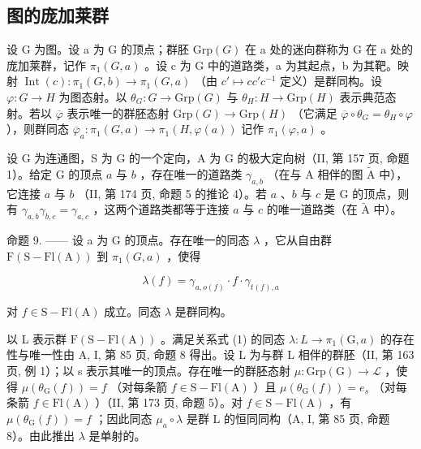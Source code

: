 \subsection{图的庞加莱群}

设 G 为图。设 a 为 G 的顶点；群胚 \(\mathrm{Grp}(G)\) 在 a 处的迷向群称为 G 在 a 处的庞加莱群，记作 \(\pi_{1}(G,a)\) 。设 c 为 G 中的道路类，a 为其起点，b 为其靶。映射 \(\operatorname{Int}(c): \pi_{1}(G,b)\to\pi_{1}(G,a)\) （由 \(c'\mapsto cc'c^{-1}\) 定义）是群同构。设 \(\varphi:G\to H\) 为图态射。以 \(\theta_{G}:G\to\mathrm{Grp}(G)\) 与 \(\theta_{H}:H\to\mathrm{Grp}(H)\) 表示典范态射。若以 \(\overline{\varphi}\) 表示唯一的群胚态射 \(\mathrm{Grp}(G) \to \mathrm{Grp}(H)\) （它满足 \(\overline{\varphi}\circ\theta_{G}=\theta_{H}\circ\varphi\) ），则群同态 \(\overline{\varphi}_{a}:\pi_{1}(G,a)\to\pi_{1}(H,\varphi(a))\) 记作 \(\pi_{1}(\varphi,a)\) 。

设 G 为连通图，S 为 G 的一个定向，A 为 G 的极大定向树（II, 第 157 页, 命题 1）。给定 G 的顶点 \(a\) 与 \(b\) ，存在唯一的道路类 \(\gamma_{a,b}\) （在与 A 相伴的图 \(\widetilde{\mathrm{A}}\) 中），它连接 \(a\) 与 \(b\) （II, 第 174 页, 命题 5 的推论 4）。若 \(a\) 、\(b\) 与 \(c\) 是 G 的顶点，则有 \(\gamma_{a,b}\gamma_{b,c} = \gamma_{a,c}\) ，这两个道路类都等于连接 \(a\) 与 \(c\) 的唯一道路类（在 \(\widetilde{\mathrm{A}}\) 中）。

命题 9. —— 设 a 为 G 的顶点。存在唯一的同态 \(\lambda\) ，它从自由群 \(\mathrm{F}(\mathrm{S}-\mathrm{Fl}(\mathrm{A}))\) 到 \(\pi_1(G, a)\) ，使得

\[
\lambda (f) = \gamma_ {a, o (f)} \cdot f \cdot \gamma_ {t (f), a}\tag{1}
\]

对 \(f \in \mathrm{S} - \mathrm{Fl}(\mathrm{A})\) 成立。同态 \(\lambda\) 是群同构。

以 L 表示群 \(\mathrm{F}(\mathrm{S}-\mathrm{Fl}(\mathrm{A}))\) 。满足关系式 (1) 的同态 \(\lambda\colon L\to\pi_{1}(\mathrm{G},a)\) 的存在性与唯一性由 A, I, 第 85 页, 命题 8 得出。设 L 为与群 L 相伴的群胚（II, 第 163 页, 例 1）；以 s 表示其唯一的顶点。存在唯一的群胚态射 \(\mu\colon\mathrm{Grp}(\mathrm{G})\to\mathcal{L}\) ，使得 \(\mu(\theta_{\mathrm{G}}(f))=f\) （对每条箭 \(f\in\mathrm{S}-\mathrm{Fl}(\mathrm{A})\) ）且 \(\mu(\theta_{\mathrm{G}}(f))=e_{s}\) （对每条箭 \(f\in\mathrm{Fl}(\mathrm{A})\) ）（II, 第 173 页, 命题 5）。对 \(f\in\mathrm{S}-\mathrm{Fl}(\mathrm{A})\) ，有 \(\mu(\theta_{\mathrm{G}}(f))=f\) ；因此同态 \(\mu_{a}\circ\lambda\) 是群 L 的恒同同构（A, I, 第 85 页, 命题 8）。由此推出 \(\lambda\) 是单射的。

